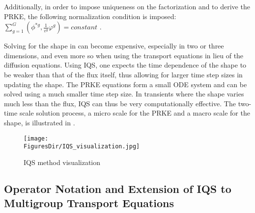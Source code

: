 Additionally, in order to impose uniqueness on the factorization and to derive the PRKE, the following normalization condition is imposed: $\sum_{g=1}^G\left(\phi^{*g},\frac{1}{v^g}\varphi^g\right) = \textit{constant}$ \cite{Dulla2008}.

Solving for the shape in  can become expensive, especially in two or three dimensions, and even more so when using the transport equations in lieu of the diffusion equations.  Using IQS, one expects the time dependence of the shape to be weaker than that of the flux itself,  thus allowing for larger time step sizes in updating the shape. The PRKE equations form a small ODE system and can be solved using a much smaller time step size. In transients where the shape varies much less than the flux, IQS can thus be very computationally effective. The two-time scale solution process, a micro scale for the PRKE and a macro scale for the shape, is illustrated in .  

\begin{figure}[!htbp]
\texttt{[image: \\FiguresDir/IQS\_visualization.jpg]}
\caption{IQS method visualization}
\label{fig:iqsviz}
\end{figure}

\subsection{Operator Notation and Extension of IQS to Multigroup Transport Equations}
\label{sect:transport}

